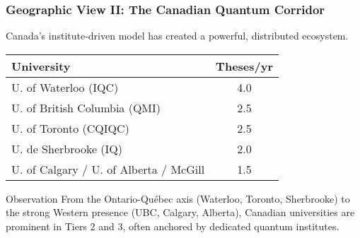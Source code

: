 \documentclass[aspectratio=169]{beamer}
\newcommand{\tabletext}{\small}
\begin{document}
\begin{frame}
    \frametitle{Geographic View II: The Canadian Quantum Corridor}
    Canada's institute-driven model has created a powerful, distributed ecosystem.

    \begin{table}
        \centering
        \tabletext
        \begin{tabularx}{\textwidth}{
            l
            S[table-format=1.1]
        }
            \toprule
            \textbf{University} & {\textbf{Theses/yr}} \\
            \midrule
            U. of Waterloo (IQC) & 4.0 \\
            U. of British Columbia (QMI) & 2.5 \\
            U. of Toronto (CQIQC) & 2.5 \\
            U. de Sherbrooke (IQ) & 2.0 \\
            U. of Calgary / U. of Alberta / McGill & 1.5 \\
            \bottomrule
        \end{tabularx}
    \end{table}
    \begin{block}{Observation}
    From the Ontario-Québec axis (Waterloo, Toronto, Sherbrooke) to the strong Western presence (UBC, Calgary, Alberta), Canadian universities are prominent in Tiers 2 and 3, often anchored by dedicated quantum institutes.
    \end{block}
\end{frame}
\end{document}
